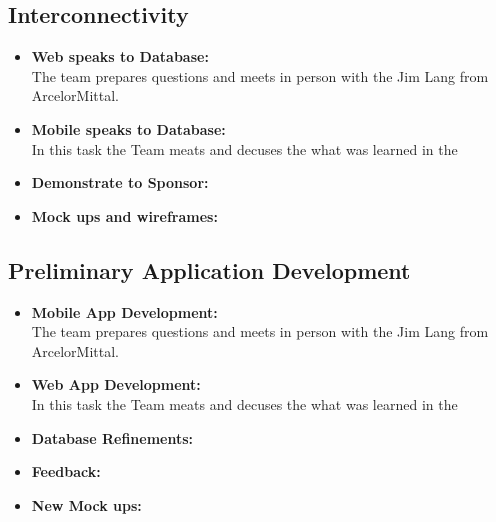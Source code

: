 \documentclass[Letter,11pt]{article}
\begin{document}
		
		
	\subsection{Interconnectivity}\label{connect}
		
		\begin{itemize}
			\item\textbf{Web speaks to Database:}\\
			The team prepares questions and meets in person with the Jim Lang from ArcelorMittal.
			
			\item \textbf{Mobile speaks to Database:}\\
			In this task the Team meats and decuses the what was learned in the 
			
			\item\textbf{Demonstrate to Sponsor:}\\
			
			\item\textbf{Mock ups and wireframes:}\\
			
		\end{itemize}
		
		\subsection{Preliminary Application Development}\label{dev1}
		
		\begin{itemize}
			\item\textbf{Mobile App Development:}\\
			The team prepares questions and meets in person with the Jim Lang from ArcelorMittal.
			
			\item \textbf{Web App Development:}\\
			In this task the Team meats and decuses the what was learned in the 
			
			\item\textbf{Database Refinements:}\\
			
			\item\textbf{Feedback:}\\
			
			\item\textbf{New Mock ups:}\\
			
		\end{itemize}
		
\end{document}
